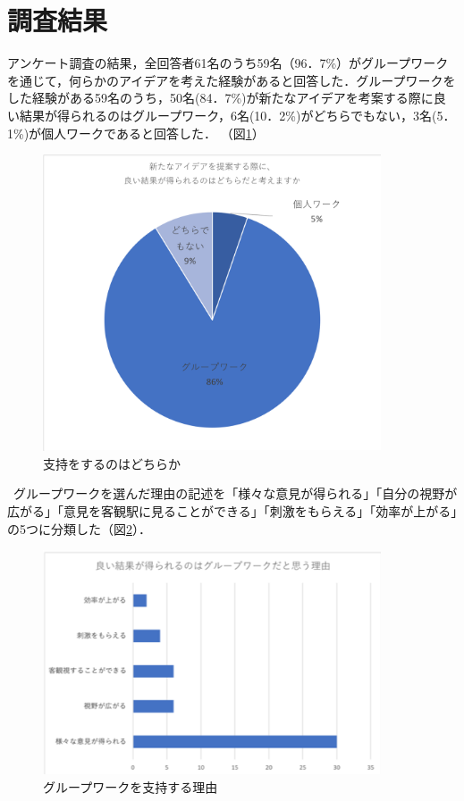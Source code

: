 \documentclass{funthesis}
\begin{document}
\section{調査結果}

アンケート調査の結果，全回答者61名のうち59名（96．7\%）がグループワークを通じて，何らかのアイデアを考えた経験があると回答した．グループワークをした経験がある59名のうち，50名(84．7\%)が新たなアイデアを考案する際に良い結果が得られるのはグループワーク，6名(10．2\%)がどちらでもない，3名(5．1\%)が個人ワークであると回答した．
（図\ref{graph0}）
\begin{figure}[H]
 \centering
   \includegraphics[width=100mm]{figures/en1.png}
 \caption{支持をするのはどちらか}
 \label{graph0}
\end{figure}

\ グループワークを選んだ理由の記述を「様々な意見が得られる」「自分の視野が広がる」「意見を客観駅に見ることができる」「刺激をもらえる」「効率が上がる」の5つに分類した（図\ref{graph1}）．
\begin{figure}[H]
 \centering
   \includegraphics[width=100mm]{figures/graph1.png}
 \caption{グループワークを支持する理由}
 \label{graph1}
\end{figure}
\end{document}
